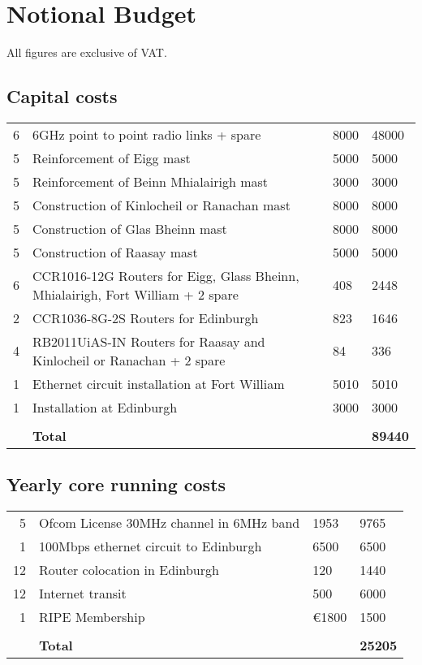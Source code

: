 \section{Notional Budget}

All figures are exclusive of VAT.

\subsection{Capital costs}

\begin{tabular}{rp{}p{}p{}}
  6 & 6GHz point to point radio links + spare & 8000 & 48000\\
  5 & Reinforcement of Eigg mast & 5000 & 5000\\
  5 & Reinforcement of Beinn Mhialairigh mast & 3000 & 3000\\
  5 & Construction of Kinlocheil or Ranachan mast & 8000 & 8000\\
  5 & Construction of Glas Bheinn mast & 8000 & 8000\\
  5 & Construction of Raasay mast & 5000 & 5000\\
  6 & CCR1016-12G Routers for Eigg, Glass Bheinn, Mhialairigh, Fort
      William + 2 spare & 408 & 2448 \\
  2 & CCR1036-8G-2S Routers for Edinburgh & 823 & 1646\\
  4 & RB2011UiAS-IN Routers for Raasay and Kinlocheil or Ranachan +
      2 spare & 84 & 336\\
  1 & Ethernet circuit installation at Fort William & 5010 & 5010\\
  1 & Installation at Edinburgh & 3000 & 3000 \\
  \hline\\
    & \textbf{Total} & & \textbf{89440}\\
\end{tabular}

\subsection{Yearly core running costs}

\begin{tabular}{rp{}p{}p{}}
  5 & Ofcom License 30MHz channel in 6MHz band & 1953 & 9765 \\
  1 & 100Mbps ethernet circuit to Edinburgh & 6500 & 6500\\
  12 & Router colocation in Edinburgh & 120 & 1440\\
  12 & Internet transit & 500 & 6000\\
  1 & RIPE Membership & \euro 1800 & 1500\\
  \hline\\
  & \textbf{Total} & & \textbf{25205}\\
\end{tabular}
